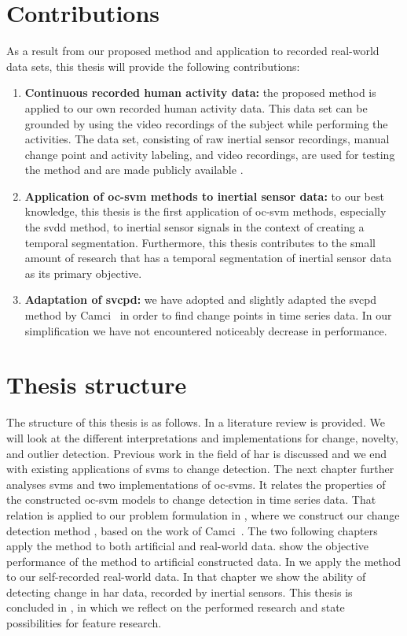 \section{Contributions}
As a result from our proposed method and application to recorded real-world data sets, this thesis will provide the following contributions:
\begin{enumerate}
  \item \textbf{Continuous recorded human activity data:} the proposed method is applied to our own recorded human activity data.
  This data set can be grounded by using the video recordings of the subject while performing the activities.
  The data set, consisting of raw inertial sensor recordings, manual change point and activity labeling, and video recordings, are used for testing the method and are made publicly available \cite{vlasveld2013continuous}.
  \item \textbf{Application of \gls{oc-svm} methods to inertial sensor data:} to our best knowledge, this thesis is the first application of \gls{oc-svm} methods, especially the \gls{svdd} method, to inertial sensor signals in the context of creating a temporal segmentation.
  Furthermore, this thesis contributes to the small amount of research that has a temporal segmentation of inertial sensor data as its primary objective.
  \item \textbf{Adaptation of \acrshort{svcpd}:} we have adopted and slightly adapted the \acrshort{svcpd} method by Camci~\cite{camci2010change} in order to find change points in time series data.
  In our simplification we have not encountered noticeably decrease in performance.
\end{enumerate}

\section{Thesis structure}
The structure of this thesis is as follows.
In  a literature review is provided.
We will look at the different interpretations and implementations for change, novelty, and outlier detection.
Previous work in the field of \gls{har} is discussed and we end with existing applications of \glspl{svm} to change detection.
The next chapter further analyses \glspl{svm} and two implementations of \glspl{oc-svm}.
It relates the properties of the constructed \gls{oc-svm} models to change detection in time series data.
That relation is applied to our problem formulation in , where we construct our change detection method , based on the work of Camci~\cite{camci2010change}.
The two following chapters apply the method to both artificial and real-world data.
 show the objective performance of the method to artificial constructed data.
In  we apply the method to our self-recorded real-world data.
In that chapter we show the ability of detecting change in \gls{har} data, recorded by inertial sensors.
This thesis is concluded in , in which we reflect on the performed research and state possibilities for feature research.